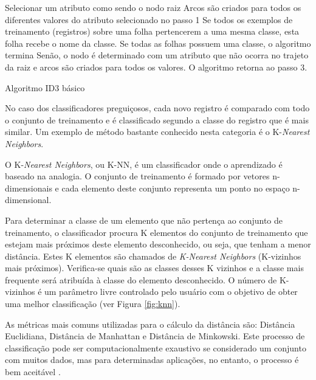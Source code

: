 \begin{algorithm}[!htb]
    \SetAlgoLined
        Selecionar um atributo como sendo o nodo raiz\;
        Arcos são criados para todos os diferentes valores do atributo selecionado no passo 1\;
        Se todos os exemplos de treinamento (registros) sobre uma folha pertencerem a uma mesma classe, esta folha recebe o nome da classe. Se todas as folhas possuem uma classe, o algoritmo termina\;
        Senão, o nodo é determinado com um atributo que não ocorra no trajeto da raiz e arcos são criados para todos os valores. O algoritmo retorna ao passo 3.
    \caption{Algoritmo ID3 básico}
    \label{alg:id3}
    \end{algorithm}
    
    
No caso dos classificadores preguiçosos, cada novo registro é comparado com todo o conjunto de treinamento e é classificado segundo a classe do registro que é mais similar. Um exemplo de método bastante conhecido nesta categoria é o K-\textit{Nearest Neighbors}.
    
O K-\textit{Nearest Neighbors}, ou K-NN, é um classificador onde o aprendizado é baseado na analogia. O conjunto de treinamento é formado por vetores n-dimensionais e cada elemento deste conjunto representa um ponto no espaço n-dimensional.
    
Para determinar a classe de um elemento que não pertença ao conjunto de treinamento, o classificador procura K elementos do conjunto de treinamento que estejam mais próximos deste elemento desconhecido, ou seja, que tenham a menor distância. Estes K elementos são chamados de \textit{K-Nearest Neighbors} (K-vizinhos mais próximos). Verifica-se quais são as classes desses K vizinhos e a classe mais frequente será atribuída à classe do elemento desconhecido. O número de K-vizinhos é um parâmetro livre controlado pelo usuário com o objetivo de obter uma melhor classificação (ver Figura \ref{fig:knn}).
        
As métricas mais comuns utilizadas para o cálculo da distância são: Distância Euclidiana, Distância de Manhattan e Distância de Minkowski. Este processo de classificação pode ser computacionalmente exaustivo se considerado um conjunto com muitos dados, mas para determinadas aplicações, no entanto, o processo é bem aceitável \cite{knn2005}.
        
